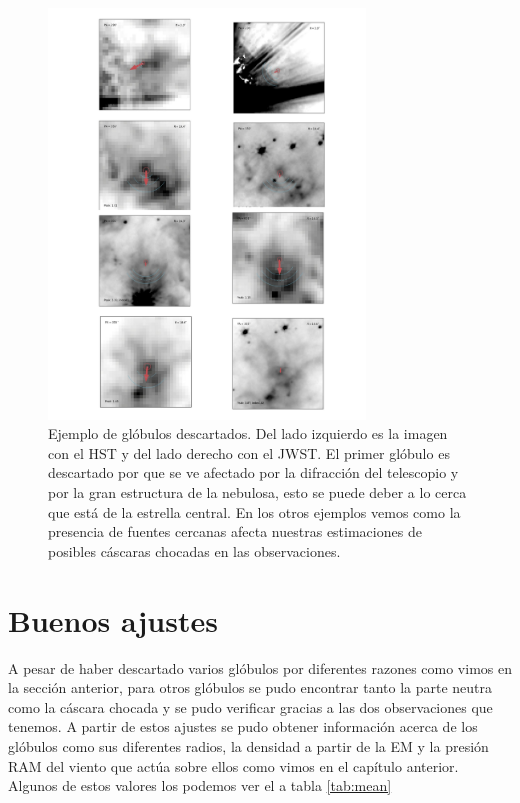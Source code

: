\documentclass{book}
\begin{document}
\begin{figure}[h!]
    \centering
    \includegraphics[width=0.75\textwidth]{images Chapter 3/C3_badG.jpg}
    \caption{Ejemplo de glóbulos descartados. Del lado izquierdo es la imagen con el HST y del lado derecho con el JWST. El primer glóbulo es descartado por que se ve afectado por la difracción del telescopio y por la gran estructura de la nebulosa, esto se puede deber a lo cerca que está de la estrella central. En los otros ejemplos vemos como la presencia de fuentes cercanas afecta nuestras estimaciones de posibles cáscaras chocadas en las observaciones.}
    \label{Bad Globules}
\end{figure}

\section{Buenos ajustes}\label{Good results}

A pesar de haber descartado varios glóbulos por diferentes razones como vimos en la sección anterior, para otros glóbulos se pudo encontrar tanto la parte neutra como la cáscara chocada y se pudo verificar gracias a las dos observaciones que tenemos. A partir de estos ajustes se pudo obtener información acerca de los glóbulos como sus diferentes radios, la densidad a partir de la EM y la presión RAM del viento que actúa sobre ellos como vimos en el capítulo anterior. Algunos de estos valores los podemos ver el a tabla \ref{tab:mean}
\end{document}
